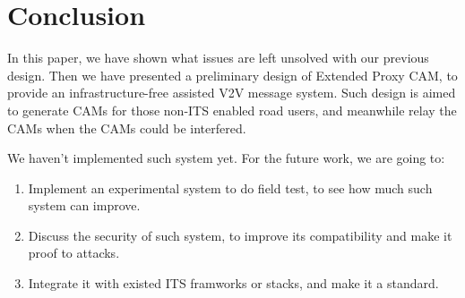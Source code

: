 \section{Conclusion} \label{sec:conclusion}

In this paper, we have shown what issues are left unsolved with our previous design.
Then we have presented a preliminary design of Extended Proxy CAM,
to provide an infrastructure-free assisted V2V message system.
Such design is aimed to generate CAMs for those non-ITS enabled road users,
and meanwhile relay the CAMs when the CAMs could be interfered.

We haven't implemented such system yet. For the future work, we are going to:
\begin{enumerate}
\item Implement an experimental system to do field test, to see how much such system can improve.
\item Discuss the security of such system, to improve its compatibility and make it proof to attacks.
\item Integrate it with existed ITS framworks or stacks, and make it a standard.
\end{enumerate}